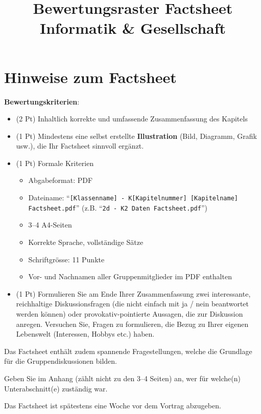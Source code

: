 

\title{Bewertungsraster Factsheet\\ \large Informatik \& Gesellschaft}

\maketitle

\section*{Hinweise zum Factsheet}

\textbf{Bewertungskriterien}:
\begin{itemize}
    \item (2 Pt) Inhaltlich korrekte und umfassende Zusammenfassung des Kapitels
    \item (1 Pt) Mindestens eine selbst erstellte \textbf{Illustration} (Bild, Diagramm, Grafik usw.), die Ihr Factsheet sinnvoll ergänzt.
    \item (1 Pt) Formale Kriterien
    \begin{itemize}
        \item Abgabeformat: PDF
        \item Dateiname: \enquote{\texttt{[Klassenname] - K[Kapitelnummer] [Kapitelname] Factsheet.pdf}} (z.B. \enquote{\texttt{2d - K2 Daten Factsheet.pdf}})
        \item 3--4 A4-Seiten
        \item Korrekte Sprache, vollständige Sätze
        \item Schriftgrösse: 11 Punkte
        \item Vor- und Nachnamen aller Gruppenmitglieder im PDF enthalten
    \end{itemize}
    \item (1 Pt) Formulieren Sie am Ende Ihrer Zusammenfassung zwei interessante, reichhaltige Diskussionsfragen (die nicht einfach mit ja / nein beantwortet werden können) oder provokativ-pointierte Aussagen, die zur Diskussion anregen. Versuchen Sie, Fragen zu formulieren, die Bezug zu Ihrer eigenen Lebenswelt (Interessen, Hobbys etc.) haben.
\end{itemize}


Das Factsheet enthält zudem spannende Fragestellungen, welche die Grundlage für die Gruppendiskussionen bilden.

Geben Sie im Anhang (zählt nicht zu den 3--4 Seiten) an, wer für welche(n) Unterabschnitt(e) zuständig war.

\vspace{1em}

Das Factsheet ist spätestens eine Woche vor dem Vortrag abzugeben.


\newpage






